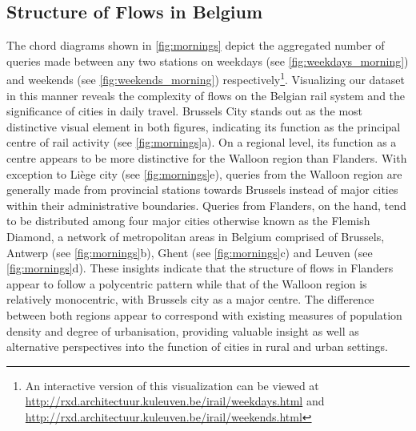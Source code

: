 \documentclass{sig-alternate}
\begin{document}
\subsection{Structure of Flows in Belgium}

The chord diagrams shown in \cref{fig:mornings} depict the aggregated number of queries made between any two stations on weekdays (see \cref{fig:weekdays_morning}) and weekends (see \cref{fig:weekends_morning}) respectively\footnote{An interactive version of this visualization can be viewed at \url{http://rxd.architectuur.kuleuven.be/irail/weekdays.html} and \url{http://rxd.architectuur.kuleuven.be/irail/weekends.html}}. 
Visualizing our dataset in this manner reveals the complexity of flows on the Belgian rail system and the significance of cities in daily travel.
Brussels City stands out as the most distinctive visual element in both figures, indicating its function as the principal centre of rail activity (see \cref{fig:mornings}a).
On a regional level, its function as a centre appears to be more distinctive for the Walloon region than Flanders.
With exception to Liège city (see \cref{fig:mornings}e), queries from the Walloon region are generally made from provincial stations towards Brussels instead of major cities within their administrative boundaries. 
Queries from Flanders, on the hand, tend to be distributed among four major cities otherwise known as the Flemish Diamond, a network of metropolitan areas in Belgium comprised of Brussels, Antwerp (see \cref{fig:mornings}b), Ghent (see \cref{fig:mornings}c) and Leuven (see \cref{fig:mornings}d). 
These insights indicate that the structure of flows in Flanders appear to follow a polycentric pattern while that of the Walloon region is relatively monocentric, with Brussels city as a major centre.
The difference between both regions appear to correspond with existing measures of population density and degree of urbanisation, providing valuable insight as well as alternative perspectives into the function of cities in rural and urban settings.
\end{document}
